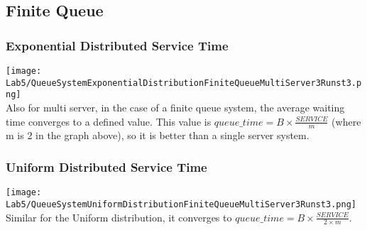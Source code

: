 \documentclass[twocolumn,letterpaper]{report}
\begin{document}
{	 			\subsection{Finite Queue}
			 			\subsubsection{Exponential Distributed Service Time}
			 			\texttt{[image: Lab5/QueueSystemExponentialDistributionFiniteQueueMultiServer3Runst3.png]} \\
		Also for multi server, in the case of a finite queue system, the average waiting time converges to a defined value. This value is $queue\_time = B \times\frac{SERVICE}{m}$ (where m is 2 in the graph above), so it is better than a single server system.
		
			 			\subsubsection{Uniform Distributed Service Time}
			 		\texttt{[image: Lab5/QueueSystemUniformDistributionFiniteQueueMultiServer3Runst3.png]} \\
			 			Similar for the Uniform distribution, it converges to $queue\_time = B \times\frac{SERVICE}{2\times m}$.
			 			
} \fi 
\end{document}
